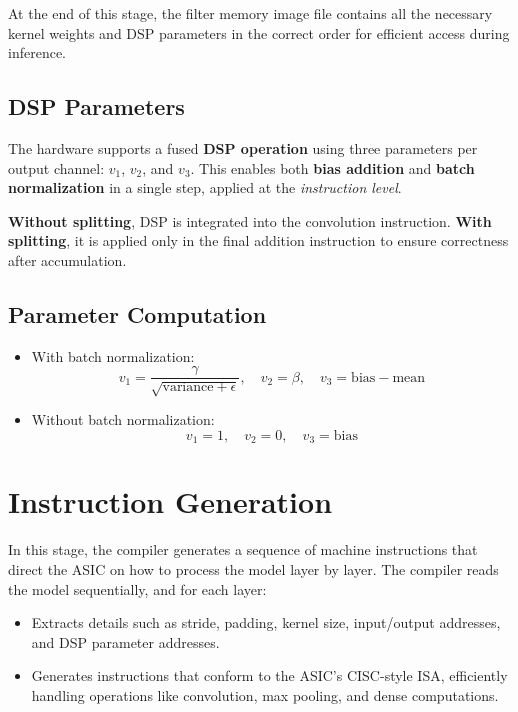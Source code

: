 \documentclass[12pt]{report}
\begin{document}
At the end of this stage, the filter memory image file contains all the necessary kernel weights and DSP parameters in the correct order for efficient access during inference.

\subsection{DSP Parameters}

The hardware supports a fused \textbf{DSP operation} using three parameters per output channel: $v_1$, $v_2$, and $v_3$. This enables both \textbf{bias addition} and \textbf{batch normalization} in a single step, applied at the \textit{instruction level}.

\textbf{Without splitting}, DSP is integrated into the convolution instruction. \textbf{With splitting}, it is applied only in the final addition instruction to ensure correctness after accumulation.

\subsection*{Parameter Computation}
\begin{itemize}
    \item With batch normalization:
          \[
              v_1 = \frac{\gamma}{\sqrt{\text{variance} + \epsilon}}, \quad
              v_2 = \beta, \quad
              v_3 = \text{bias} - \text{mean}
          \]
    \item Without batch normalization:
          \[
              v_1 = 1, \quad
              v_2 = 0, \quad
              v_3 = \text{bias}
          \]
\end{itemize}


\section{Instruction Generation}

In this stage, the compiler generates a sequence of machine instructions that direct the ASIC on how to process the model layer by layer. The compiler reads the model sequentially, and for each layer:
\begin{itemize}
    \item Extracts details such as stride, padding, kernel size, input/output addresses, and DSP parameter addresses.
    \item Generates instructions that conform to the ASIC’s CISC-style ISA, efficiently handling operations like convolution, max pooling, and dense computations.
\end{itemize}
\end{document}
